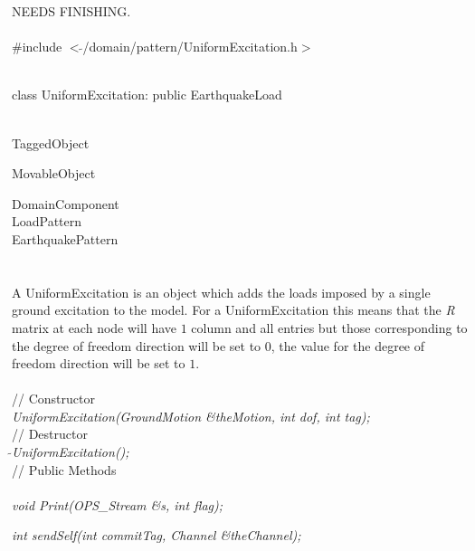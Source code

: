 
NEEDS FINISHING. \\

   \\
\#include $<\tilde{ }$/domain/pattern/UniformExcitation.h$>$  


  \\
class UniformExcitation: public EarthquakeLoad  


 \\
TaggedObject 

MovableObject 

\indent\indent DomainComponent \\
\indent\indent\indent LoadPattern \\
\indent\indent\indent\indent EarthquakePattern \\
\indent\indent\indent{} \\

 \\ 
\indent A UniformExcitation is an object which adds the loads imposed
by a single ground excitation to the model. For a UniformExcitation
this means that the {\em R} matrix at each node will have $1$ column
and all entries but those corresponding to the degree of freedom
direction will be set to $0$, the value for the degree of freedom
direction will be set to $1$.\\

 \\
\indent // Constructor \\ 
{\em UniformExcitation(GroundMotion \&theMotion, int dof, int tag);}\\ 

\indent // Destructor \\ 
{\em $\tilde{ }$UniformExcitation();}\\  

\indent // Public Methods \\ 
 \\ 
{\em void Print(OPS_Stream \&s, int flag);}

{\em int sendSelf(int commitTag, Channel \&theChannel);}

\\

